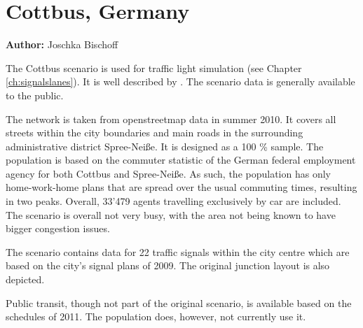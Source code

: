 \section{Cottbus, Germany}
\label{ch:scenarios:cottbus}
\hfill \textbf{Author:} Joschka Bischoff

The Cottbus scenario is used for traffic light simulation (see Chapter \ref{ch:signalslanes}). It is well described by \citet[][]{Grether_PhDThesis_2014}. The scenario data is generally available to the public.

The network is taken from openstreetmap data in summer 2010. It covers all streets within the city boundaries and main roads in the surrounding administrative district Spree-Neiße. It is designed as a 100 \% sample. The population is based on the commuter statistic of the German federal employment agency for both Cottbus and Spree-Neiße. As such, the population has only home-work-home plans that are spread over the usual commuting times, resulting in two peaks. Overall, 33'479 agents travelling exclusively by car are included. The scenario is overall not very busy, with the area not being known to have bigger congestion issues.

The scenario contains data for 22 traffic signals within the city centre which are based on the city's signal plans of 2009. The original junction layout is also depicted.

Public transit, though not part of the original scenario, is available based on the schedules of 2011. The population does, however, not currently use it. 



